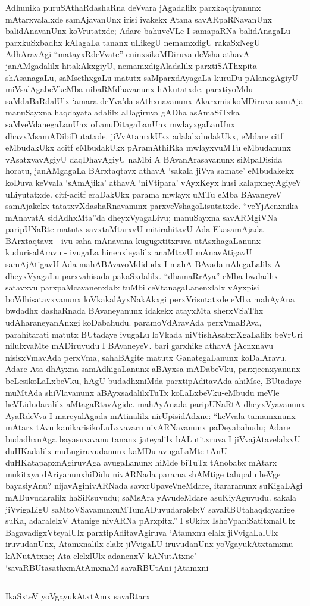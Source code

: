 Adhunika puruSAthaRdashaRna deVvara jAgadalilx parxkaqtiyanunx mAtarxvalalxde samAja\-vanUnx irisi ivakekx Atana savARpaRNavanUnx balidAnavanUnx koVrutatxde; Adare bahuveVLe I samapaRNa balidAnagaLu parxkuSxbadhx kAlagaLa tananx uLikegU nemamxdigU rakaSxNegU AdhAravAgi ``matayxRdeVvate'' eninxsikoMDiruva deVsha athavA janAMgadalilx hita\break\-kAkxgiyU, nemamxdigAladalilx parxtiSAThxpita shAsanagaLu, saMsethxgaLu matutx saMparxdAya\-gaLa kuruDu pAlanegAgiyU miVsalAgabeVkeMba nibaRMdhavanunx hAkutatxde. parxtiyoMdu saMdaBaRdalUlx `amara deYva'da sAthxnavanunx AkarxmisikoMDiruva samAja manuSayxna haqdayataladalilx aDagiruva gADha asAmaSiTxka saMveVdanegaLanUnx oLanuDitagaLanUnx mwlayxgaLanUnx dhavxMsamADibiDutatxde. jiVvAtamxkUkx adalalxdudakUkx, eMdare citf eMbu\-dakUkx acitf eMbudakUkx pAramAthiRka mwlayxvuMTu eMbudanunx vAsatxvavAgiyU daqDhavAgiyU naMbi A BAvanArasavanunx siMpaDisida horatu, janAMgagaLa BArxtaqtavx athavA `sakala jiVva samate' eMbudakekx koDuva keVvala `sAmAjika' athavA `niVtipara' vAyxKeyx husi kalapxneyAgiyeV uLiyutatxde. citf-acitf eraDakUkx parama mwlayx uMTu eMba BAvaneyeV samAjakekx tatatxvXdashaRnavanunx parxveVshagoLisutatxde. ``veYjAcnx\-nika mAnavatA sidAdhxMta''da dheyxVyagaLivu; manuSayxna savARMgiVNa paripUNaRte matutx savxtaMtarxvU mitirahitavU Ada EkasamAjada BArxtaqtavx - ivu saha mAnavana kugugx\-titxruva utAsxhagaLanunx kudurisalAravu - ivugaLa hinenxleyalilx anaMtavU mAna\-vAtigavU samAjAtigavU Ada mahABAvavoMdidudx I mahA BAvada nAlegaLalilx A dheyxVyagaLu parxvahisada pakaSxdalilx. ``dhamaRrAya'' eMba bwdadhx satavxvu parxpaMcavanenxlalx tuMbi ceVtanagaLanenxlalx vAyxpisi boVdhisatavxvanunx loVkakalAyxNakAkxgi perxVrisutatxde eMba mahAyAna bwdadhx dashaRnada BAvaneyanunx idakekx atayxMta sherxVSaThx udAharaneyanAnxgi koDabahudu. paramoVdAravAda perxVmaBAva, parahitarati matutx BUtadaye ivu\-gaLu loVkada niVtishAsatxrXgaLalilx beVrUri nilulxvaMte mADiruvudu I BAvaneyeV. bari garxhike athavA jAcnxnavu nisisxVmavAda perxVma, sahaBAgite matutx GanategaLanunx koDa\-lAravu. Adare Ata dhAyxna samAdhigaLanunx aBAyxsa mADabeVku, parxjecnxyanunx beLesi\-koLaLxbeVku, hAgU budadhxniMda parxtipAditavAda ahiMse, BUtadaye muMtAda shiVla\-vanunx aBAyxsadalilxTuTx koLaLxbeVku-eMbudu meVle heVLidudaralilx aMtagaRtavAgide. mahAyAnada paripUNaRtA dheyxVyavanunx AyaRdeVva I mareyalAgada mAti\-nalilx nirUpisidAdxne: ``keVvala tamamxnunx mAtarx tAvu kanikarisikoLuLxvavaru nivARNa\-vanunx paDeyabahudu; Adare budadhxnAga bayasuvavanu tananx jateyalilx bALutitxruva I jiVvajAtavelalxvU duHKadalilx muLugiruvudanunx kaMDu avugaLaMte tAnU duHKa\-tapapxnAgiruvAga avugaLanunx hiMde biTuTx tAnobabx mAtarx mukitxya dAriyanunx\break hiDidu nivARNada parama shAMtige talupalu heVge bayasiyAnu? nijavAgi\break nivARNada savxrUpaveVneMdare, itararanunx suKigaLAgi mADuvudaralilx haSiRsuvudu; saMsAra yAvudeMdare asuKiyAguvudu. sakala jiVvigaLigU saMtoVSavanunx\break uMTu\-mADuvudaralelxV savaRBUtahaqdayanige suKa, adaralelxV Atanige nivARNa pArxpitx.'' I sUkitx IshoVpaniSatitxnalUlx BagavadigxVteyalUlx parxtipAditavAgiruva `Atamxnu elalx jiVvigaLalUlx iruvudanUnx, Atamxnalilx elalx jiVvigaLU iruvudanUnx yoVgayukAtxtamxnu kANutAtxne; Ata elelxlUlx adanenxV kANutAtxne' - `savaRBUtasathxmAtAmxnaM savaRBUtAni jAtamxni {\rm \rule{.03cm}{.2cm}} IkaSxteV yoVgayukAtxtAmx savaRtarx 